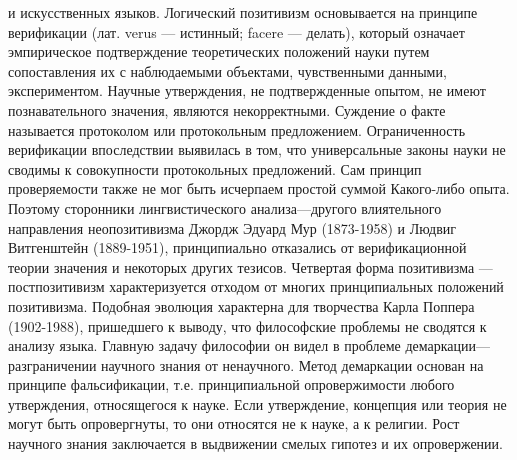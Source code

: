 \documentclass[12pt]{article}
\begin{document}
и  искусственных  языков.  Логический  позитивизм  основывается  на  принципе  верификации  (лат.  verus  —
истинный; facere — делать), который означает эмпирическое подтверждение теоретических положений науки
путем  сопоставления  их  с  наблюдаемыми  объектами,  чувственными  данными,  экспериментом.  Научные
утверждения,  не  подтвержденные  опытом,  не  имеют  познавательного  значения,  являются  некорректными. 
Суждение о факте называется протоколом или протокольным предложением. Ограниченность верификации
впоследствии выявилась в том, что универсальные законы науки не сводимы к совокупности протокольных
предложений. Сам принцип проверяемости также не мог быть исчерпаем простой суммой Какого-либо опыта.
Поэтому сторонники лингвистического анализа—другого влиятельного направления неопозитивизма Джордж
Эдуард Мур (1873-1958) и Людвиг Витгенштейн (1889-1951), принципиально отказались от верификационной
теории значения и некоторых других тезисов.
Четвертая  форма  позитивизма  —  постпозитивизм  характеризуется  отходом  от  многих  принципиальных
положений  позитивизма.  Подобная  эволюция  характерна  для  творчества  Карла  Поппера  (1902-1988),
пришедшего к выводу, что философские проблемы не сводятся к анализу языка. Главную задачу философии он
видел в проблеме демаркации— разграничении научного знания от ненаучного. Метод демаркации основан на
принципе фальсификации, т.е. принципиальной опровержимости любого утверждения, относящегося к науке.
Если утверждение, концепция или теория не могут быть опровергнуты, то они относятся не к науке, а к
религии. Рост научного знания заключается в выдвижении смелых гипотез и их опровержении.

\newpage
\end{document}
